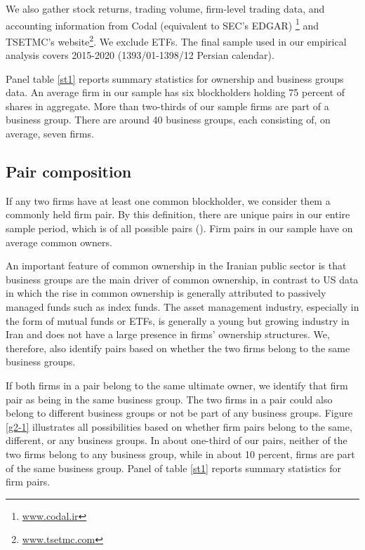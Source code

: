 	We also gather stock returns, trading volume, firm-level trading data, and accounting information from Codal (equivalent to SEC's EDGAR) \footnote{\href{http://www.codal.ir}{www.codal.ir}}
and TSETMC's website\footnote{\href{http://www.tsetmc.com}{www.tsetmc.com}}. We exclude ETFs. The final sample used in our empirical analysis covers 2015-2020 (1393/01-1398/12 Persian calendar). 



Panel  table \ref{st1} reports summary statistics for ownership and business groups data. An average firm in our sample has six blockholders holding 75 percent of shares in aggregate. More than two-thirds of our sample firms are part of a business group. There are around 40 business groups, each consisting of, on average, seven firms.






\subsection{{Pair composition} }

	If any two firms have at least one common blockholder, we consider them a commonly held firm pair. By this definition, there are   unique pairs in our entire sample period, which is of all possible pairs (). Firm pairs in our sample have on average common owners. 
	
	An important feature of common ownership in the Iranian public sector is that business groups are the main driver of common ownership, in contrast to US data in which the rise in common ownership is generally attributed to passively managed funds such as index funds. The asset management industry, especially in the form of mutual funds or ETFs, is generally a young but growing industry in Iran and does not have a large presence in firms' ownership structures. We, therefore, also identify pairs based on whether the two firms belong to the same business groups. 
		
		If both firms in a pair belong to the same ultimate owner, we identify that firm pair as being in the same business group. The two firms in a pair could also belong to different business groups or not be part of any business groups. Figure \ref{g2-1} illustrates all possibilities based on whether firm pairs belong to the same, different, or any business groups. In about one-third of our pairs, neither of the two firms belong to any business group, while in about 10 percent, firms are part of the same business group. Panel  of table \ref{st1} reports summary statistics for firm pairs.
	
